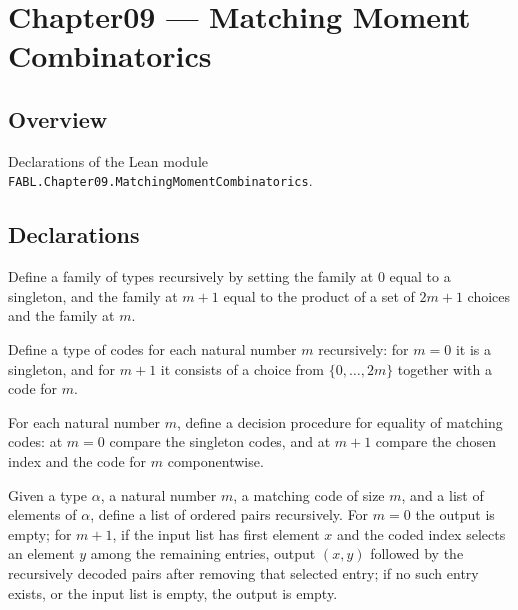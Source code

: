\chapter{Chapter09 — Matching Moment Combinatorics}
\section{Overview}

Declarations of the Lean module \texttt{FABL.Chapter09.MatchingMomentCombinatorics}.

\section{Declarations}

\begin{definition}
\label{FABL.PerfectMatchingCode}
\leanok
Define a family of types recursively by setting the family at $0$ equal to a singleton,
and the family at $m+1$ equal to the product of a set of $2m+1$ choices and the family
at $m$.
\end{definition}

\begin{definition}
\label{FABL.perfectMatchingCodeFintype}
\leanok
{}
Define a type of codes for each natural number $m$ recursively: for $m=0$ it is a
singleton, and for $m+1$ it consists of a choice from $\{0,\ldots,2m\}$ together with a
code for $m$.
\end{definition}

\begin{definition}
\label{FABL.perfectMatchingCodeDecidableEq}
\leanok
{}
For each natural number $m$, define a decision procedure for equality of matching codes:
at $m=0$ compare the singleton codes, and at $m+1$ compare the chosen index and the code
for $m$ componentwise.
\end{definition}

\begin{definition}
\label{FABL.decodePerfectMatchingCode}
\leanok
{}
Given a type $\alpha$, a natural number $m$, a matching code of size $m$, and a list of
elements of $\alpha$, define a list of ordered pairs recursively. For $m=0$ the output
is empty; for $m+1$, if the input list has first element $x$ and the coded index selects
an element $y$ among the remaining entries, output $(x,y)$ followed by the recursively
decoded pairs after removing that selected entry; if no such entry exists, or the input
list is empty, the output is empty.
\end{definition}

